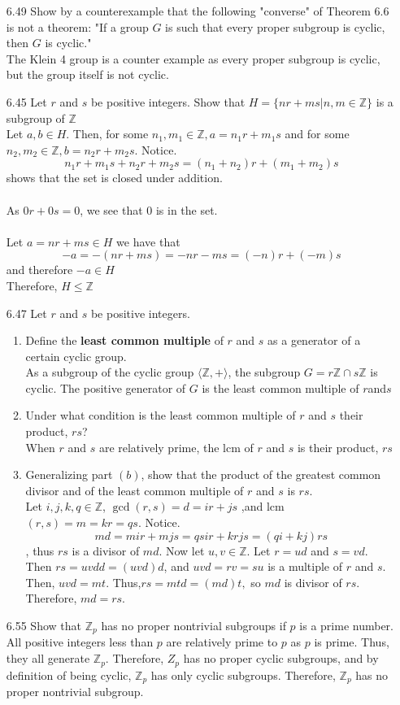 \documentclass[12pt]{article}
\newcommand{\Z}{\mathds{Z}}
\begin{document}
\begin{enumerate}
	\item[6.49] Show by a counterexample that the following "converse" of Theorem 6.6 is not a theorem: "If a group $G$ is such that every proper subgroup is cyclic, then $G$ is cyclic."\\
	The Klein 4 group is a counter example as every proper subgroup is cyclic, but the group itself is not cyclic.
	\item[6.45] Let $r$ and $s$ be positive integers. Show that $H=\{nr+ms|n,m \in \Z \}$ is a subgroup of $\Z$\\
		Let $ a,b \in H $. Then, for some $n_1,m_1 \in \Z, a = n_1r+m_1s $ and  for some $n_2,m_2 \in \Z, b = n_2r+m_2s $. Notice. 
		\[n_1r+m_1s+n_2r+m_2s=(n_1+n_2)r+(m_1+m_2)s\]
		shows that the set is closed under addition.\\
		\\
		As $ 0r+0s=0 $, we see that 0 is in the set.\\
		\\
		Let $ a = nr+ms \in H$ we have that \[-a=-(nr+ms)=-nr-ms=(-n)r+(-m)s\]
		and therefore $ -a\in H $\\
		Therefore, $ H \leq \Z $
	\item[6.47] Let $r$ and $s$ be positive integers.
	\begin{enumerate}
		\item Define the \textbf{least common multiple} of $r$ and $s$ as a generator of a certain cyclic group.\\
		As a subgroup of the cyclic group $ \langle\Z, +\rangle$, the subgroup $G = r\Z \cap s\Z$ is cyclic. The positive generator of $ G $ is the least common multiple of $ r  $and$  s $
		\item Under what condition is the least common multiple of $r$ and $s$ their product, $rs$?\\
		When $ r $ and $ s $ are relatively prime, the lcm of $ r $ and $ s $ is their product, $ rs $ 
		\item Generalizing part $(b)$, show that the product of the greatest common divisor and of the least common multiple of $r$ and $s$ is $rs$.\\
		
		 Let $ i,j,k,q\in\Z $, $ \gcd(r,s) = d = ir + js $ ,and lcm$(r,s) = m = kr = qs$. Notice.
		 \[md = mir + mjs = qsir + krjs = (qi + kj)rs\], thus $ rs $ is a divisor of $ md $. Now let $ u,v\in\Z$. Let $ r = ud $
		and $  s = vd$. Then $ rs = uvdd = (uvd)d $, and $ uvd = rv = su $ is a multiple of $ r $ and $ s $. Then,  $ uvd = mt $. Thus,$  rs = mtd = (md)t, $ so $ md $ is divisor of $ rs $. Therefore, $ md = rs.$
		
	\end{enumerate}
	
	\item[6.55] Show that $ \Z_p $ has no proper nontrivial subgroups if $ p $ is a prime number.\\
		All positive integers less than $ p $ are relatively prime to $ p $ as $ p $ is prime. Thus, they all generate $ \Z_p $. Therefore, $ Z_p $ has no proper cyclic subgroups, and by definition of being cyclic, $ \Z_p $ has only cyclic subgroups. Therefore, $ \Z_p $ has no proper nontrivial subgroup.
	\end{enumerate}
\end{document}
